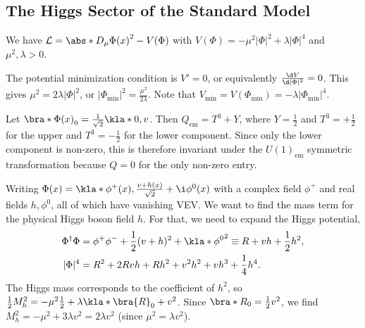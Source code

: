 \documentclass[english, parskip=full]{scrbook}
\newcommand{\example}[3]{\begin{tcolorbox}[colback=colorbackgroundexample,colframe=colorexample, breakable,enhanced,title={\textbf{#1}: #2.}]#3\end{tcolorbox}}
\begin{document}
\subsection{The Higgs Sector of the Standard Model}
We have $\mathcal{L}=\abs*{D_\mu\Phi(x)}^2 - V(\Phi)$ with $V(\Phi)=-\mu^2 |\Phi|^2 + \lambda |\Phi|^4$ and $\mu^2,\lambda > 0$.
\example{Higgs Potential}{Vacuum Expectation Value}{
The potential minimization condition is $V'=0$, or equivalently $\frac{\d V}{\d |\Phi|^2} = 0$.
This gives $\mu^2 = 2\lambda |\Phi|^2$, or $|\Phi_\text{min}|^2 = \frac{\mu^2}{2\lambda}$.
Note that $V_\text{min}=V(\Phi_\text{min}) = -\lambda |\Phi_\text{min}|^4$.
}
\example{Higgs doublet}{VEV}{
Let $\bra*{\Phi(x)}_0 = \frac{1}{\sqrt{2}} \kla*{0, v}$.
Then $Q_\text{em} = T^3 + Y$, where $Y=\frac{1}{2}$ and $T^3=+\frac{1}{2}$ for the upper and $T^3=-\frac{1}{2}$ for the lower component.
Since only the lower component is non-zero, this is therefore invariant under the $U(1)_\text{em}$ symmetric transformation because $Q=0$ for the only non-zero entry.
}
\example{Higgs Potential}{Expand around minimum}{
Writing $\Phi(x) = \kla*{\phi^+(x), \frac{v+h(x)}{\sqrt{2}} + \i \phi^0(x)}$ with a complex field $\phi^+$ and real fields $h,\phi^0$, all of which have vanishing VEV.
We want to find the mass term for the physical Higgs boson field $h$.
For that, we need to expand the Higgs potential,
\begin{align}
\Phi^\dagger\Phi &= \phi^+\phi^- + \frac{1}{2}(v+h)^2 + \kla*{\phi^0}^2 \equiv R + vh + \frac{1}{2}h^2,\\
|\Phi|^4 &= R^2 + 2Rvh + Rh^2 + v^2h^2 + vh^3 + \frac{1}{4}h^4.
\end{align}
The Higgs mass corresponds to the coefficient of $h^2$, so $\frac{1}{2}M_h^2 = -\mu^2 \frac{1}{2} + \lambda\kla*{\bra{R}_0+v^2}$.
Since $\bra*{R}_0=\frac{1}{2}v^2$, we find $M_h^2 = -\mu^2 + 3\lambda v^2 = 2\lambda v^2$ (since $\mu^2=\lambda v^2$).
}
\end{document}

